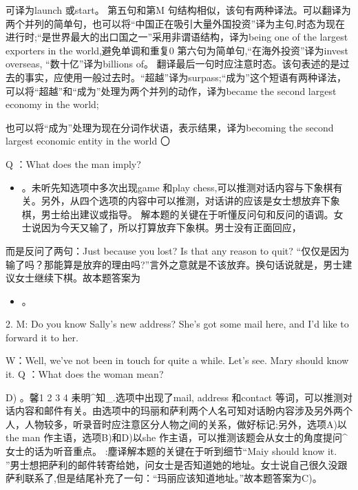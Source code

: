 \documentclass[UTF8,11pt]{ctexart}
\begin{document}
可译为launch 或start。 第五句和第M 句结构相似，该句有两种译法。可以翻译为两个并列的简单句，也可以将“中国正在吸引大量外国投资”译为主句,时态为现在进行时;“是世界最大的出口国之一”采用非谓语结构，译为being one of the largest exporters in the world,避免单调和重复0 第六句为简单句,“在海外投资”译为invest overseas, “数十亿”译为billions of。 翻译最后一句时应注意时态。该句表述的是过去的事实，应使用一般过去时。“超越”译为surpass;“成为”这个短语有两种译法，可以将“超越”和“成为”处理为两个并列的动作，译为became the second largest economy in the world;


也可以将“成为”处理为现在分词作状语，表示结果，译为becoming the second largest economic entity in the world 〇


Q ：What does the man imply?


\begin{itemize}[leftmargin=2em,itemsep=.2em,topsep=.4em]\item[C.] 。未听先知选项中多次出现game 和play chess,可以推测对话内容与下象棋有关。另外，从四个选项的内容中可以推测，对话讲的应该是女士想放弃下象棋，男士给出建议或指导。 解本题的关键在于听懂反问句和反问的语调。女士说因为今天又输了，所以打算放弃下象棋。男士没有正面回应，
\end{itemize}

而是反问了两句：Just because you lost? Is that any reason to quit? “仅仅是因为输了吗？那能算是放弃的理由吗?”言外之意就是不该放弃。换句话说就是，男士建议女士继续下棋。故本题答案为


\begin{itemize}[leftmargin=2em,itemsep=.2em,topsep=.4em]\item[D.] 。
\end{itemize}

2. M: Do you know Sally’s new address? She’s got some mail here, and I’d like to forward it to her.


W：Well, we've not been in touch for quite a while. Let’s see. Mary should know it. Q ：What does the woman mean?


D) 。馨1 2 3 4 耒明\textasciicircum{}知\_.选项中出现了mail, address 和contact 等词，可以推测对话内容和邮件有关。由选项中的玛丽和萨利两个人名可知对话盼内容涉及另外两个人，人物较多，听录音时应注意区分人物之间的关系，做好标记;另外，选项A)以the man 作主语，选项B)和D)以she 作主语，可以推测该题会从女士的角度提问\textasciicircum{}女士的话为听音重点。 :塵译解本题的关键在于听到细节“Maiy should know it. ”男士想把萨利的邮件转寄给她，问女士是否知道她的地址。女士说自己很久没跟萨利联系了,但是结尾补充了一句：“玛丽应该知道地址。”故本题答案为C)。
\end{document}

